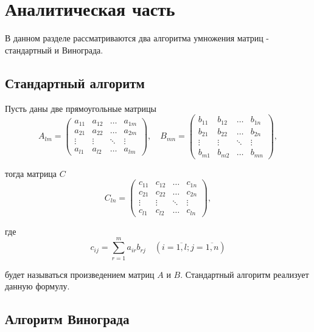 \documentclass[12pt]{report}
\begin{document}
\chapter{Аналитическая часть}
В данном разделе рассматриваются два алгоритма умножения матриц - стандартный и Винограда.
\section{Стандартный алгоритм}

Пусть даны две прямоугольные матрицы
\begin{equation}
	A_{lm} = \begin{pmatrix}
		a_{11} & a_{12} & \ldots & a_{1m}\\
		a_{21} & a_{22} & \ldots & a_{2m}\\
		\vdots & \vdots & \ddots & \vdots\\
		a_{l1} & a_{l2} & \ldots & a_{lm}
	\end{pmatrix},
	\quad
		B_{mn} = \begin{pmatrix}
		b_{11} & b_{12} & \ldots & b_{1n}\\
		b_{21} & b_{22} & \ldots & b_{2n}\\
		\vdots & \vdots & \ddots & \vdots\\
		b_{m1} & b_{m2} & \ldots & b_{mn}
	\end{pmatrix},
\end{equation}

тогда матрица $C$
\begin{equation}
	C_{ln} = \begin{pmatrix}
		c_{11} & c_{12} & \ldots & c_{1n}\\
		c_{21} & c_{22} & \ldots & c_{2n}\\
		\vdots & \vdots & \ddots & \vdots\\
		c_{l1} & c_{l2} & \ldots & c_{ln}
	\end{pmatrix},
\end{equation}

где
\begin{equation}
	\label{eq:M}
	c_{ij} =
		\sum_{r=1}^{m} a_{ir}b_{rj} \quad (i=\overline{1,l}; j=\overline{1,n})
\end{equation}

будет называться произведением матриц $A$ и $B$.
Стандартный алгоритм реализует данную формулу.

\section{Алгоритм Винограда}
\end{document}
